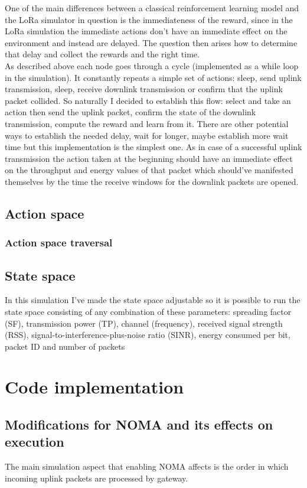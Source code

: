 One of the main differences between a classical reinforcement
learning model and the LoRa simulator in question is the immediateness of the reward, since in the LoRa simulation the immediate actions don't have an immediate effect on the environment and instead are delayed. The question then arises how to determine that delay and collect the rewards and the right time. \\

As described above each node goes through a cycle (implemented 
as a while loop in the simulation). It constantly repeats
a simple set of actions: sleep, send uplink transmission, sleep,
receive downlink transmission or confirm that the uplink 
packet collided. So naturally I decided to establish this flow:
select and take an action then send the uplink packet,
confirm the state of the downlink transmission, compute
the reward and learn from it. There are other potential 
ways to establish the needed delay, wait for longer, maybe 
establish more wait time but this implementation is the 
simplest one. As in case of a successful uplink transmission
the action taken at the beginning should have an immediate effect on the throughput and energy values of that packet 
which should've manifested themselves by the time the receive
windows for the downlink packets are opened. 

\subsection{Action space}
\subsubsection{Action space traversal}
\subsection{State space}
In this simulation I've made the state space adjustable 
so it is possible to run the state space consisting of any 
combination of these parameters: spreading factor (SF), 
transmission power (TP), channel (frequency), received signal
strength (RSS), signal-to-interference-plus-noise ratio (SINR),
energy consumed per bit, packet ID and number of packets

\section{Code implementation}
\subsection{Modifications for NOMA and its effects on execution}
The main simulation aspect that enabling NOMA affects is the 
order in which incoming uplink packets are processed by gateway.

